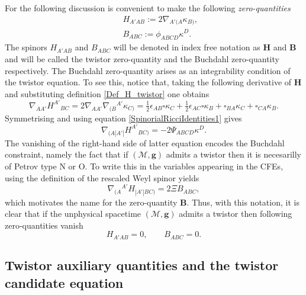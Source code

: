 \documentclass[10pt,a4paper]{article}
\theoremstyle{plain}
\def\bmg{{\bm g}}
\def\bmB{{\bm B}}
\def\bmH{{\bm H}}
\begin{document}
For the following discussion is convenient to make the following
\emph{zero-quantities}
\begin{subequations}
  \begin{eqnarray}
   && H_{A'AB} := 2
    \nabla_{A'(A}\kappa_{B)},\label{Def_H_twistor}\\ && B_{ABC}
    := \phi_{ABCD}\kappa^D.\label{Def_B_twistor}
    \end{eqnarray}
\end{subequations}
The spinors $H_{A'AB}$ and $B_{ABC}$ will be denoted in index free
notation as $\bmH$ and $\bmB$ and will be called the twistor
zero-quantity and the Buchdahl zero-quantity respectively.  The
Buchdahl zero-quantity arises as an integrability condition of the
twistor equation.  To see this, notice that, taking the following
derivative of $\bmH$ and substituting definition
\eqref{Def_H_twistor} one obtains
  \begin{equation}\label{curl_H_twistor}
  \nabla_{AA'}H^{A'}{}_{BC}= 2 \nabla_{AA'}\nabla_{(B}{}^{A'}\kappa
  _{C)} = \tfrac{1}{2} \epsilon _{AB} \square \kappa _{C}  +
  \tfrac{1}{2}  \epsilon _{AC} \square \kappa _{B} +
  \square_{BA}\kappa _{C} + \square_{CA}\kappa _{B}.
  \end{equation}
  Symmetrising and using equation \eqref{SpinorialRicciIdentities1} gives
  \[
  \nabla_{(A|A'|}H^{A'}{}_{BC)}= - 2\Psi_{ABCD}\kappa^D.
  \]
  The vanishing of the right-hand side of latter equation encodes the
  Buchdahl constraint, namely the fact that if $(\mathcal{M},\bmg)$
  admits a twistor then it is necesarilly of Petrov type N or O. To
  write this in the variables appearing in the CFEs,
  using the definition of the rescaled Weyl spinor
  yields
  \begin{equation}\label{Curl_H_sym_toB_twistor}
  \nabla_{(A}{}^{A'}H_{|A'|BC)} = 2\Xi B_{ABC},
  \end{equation}
  which motivates the name for the zero-quantity $\bmB$.
  Thus, with this notation, it is clear that if the unphysical spacetime
  $(\mathcal{M},\bmg)$ admits a twistor  then following
  zero-quantities vanish
  \begin{equation}
H_{A'AB}=0, \qquad B_{ABC}=0.
  \end{equation}
  
\subsection{Twistor auxiliary quantities and the twistor candidate equation}
  
\end{document}
